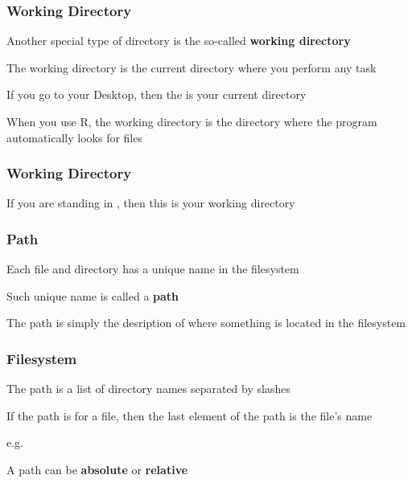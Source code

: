 \documentclass[12pt]{beamer}\usepackage[]{graphicx}\usepackage[]{color}
\begin{document}

\begin{frame}[fragile]
\frametitle{Working Directory}

\bi
  \item Another special type of directory is the so-called \textbf{working directory}
  \item The working directory is the current directory where you perform any task
  \item If you go to your Desktop, then the  is your current directory
  \item When you use R, the working directory is the directory where the program automatically looks for files 
\ei

\end{frame}


\begin{frame}[fragile]
\frametitle{Working Directory}
\begin{center}
\end{center}

If you are standing in {\hilit {}}, then this is your working directory

\end{frame}


\begin{frame}
\begin{center}
\Huge{}
\end{center}
\end{frame}


\begin{frame}
\frametitle{Path}
\bbi
  \item Each file and directory has a unique name in the filesystem
  \item Such unique name is called a \textbf{path}
  \item The path is simply the desription of where something is located in the filesystem
\ei
\end{frame}


\begin{frame}
\frametitle{Filesystem}
\bi
  \item The path is a list of directory names separated by slashes
  \item If the path is for a file, then the last element of the path is the file's name
  \item e.g. 
  \item A path can be \textbf{absolute} or \textbf{relative}
\ei
\end{frame}
\end{document}
